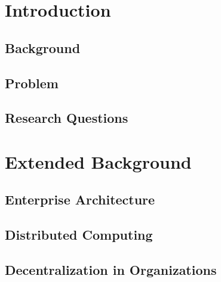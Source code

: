 \documentclass[12pt,
               a4,
               twoside,
               openright]{book} %
\begin{document}
  
    \frontmatterDSV %
    
    \tableofcontents
    
    \chapter{Introduction}
    \label{chap:introduction}
    
    \section{Background}
    \label{sec:background}
    

    \section{Problem}
    \label{sec:problem}    
    
    
    \section{Research Questions}
    \label{sec:resq}
    
    
    
    \chapter{Extended Background}
    \label{chap:extendedBackgrounf}
    
    \section{Enterprise Architecture}
    \label{sec:ea}
    
    
    \section{Distributed Computing}
    \label{sec:distributed}
       
    
    \section{Decentralization in Organizations}
    \label{sec:organizations}
       
    
\end{document}
